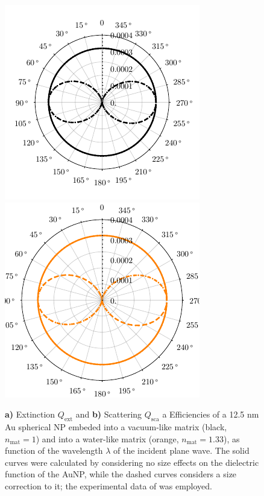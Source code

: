  
 
 
 
 \begin{figure}
 \includegraphics[scale=1]{1-Theory-Figs/Mie-Au/S-12--5nm-Au-in-Air.pdf}
 \includegraphics[scale=1]{1-Theory-Figs/Mie-Au/S-12--5nm-Au-in-H2O.pdf}
\caption[Extinction and Scattering Corss Section of a 12.5 nm Au spherical NP embeded into a vacuum- and into a waterlike environment]{ \textbf{a)} Extinction $Q_\text{ext}$ and \textbf{b)} Scattering $Q_\text{sca}$ a Efficiencies of a 12.5 nm Au spherical NP embeded into a vacuum-like matrix (black, $n_\text{mat} = 1$)  and into a water-like matrix (orange, $n_\text{mat} = 1.33$), as function of  the wavelength $\lambda$ of the incident plane wave.  The solid curves were calculated by considering no size effects on the dielectric function of the AuNP, while the dashed curves considers a size correction to it; the experimental data of \citeauthor{johnson_optical_1972} \cite{johnson_optical_1972} was employed.} 
 \end{figure}

